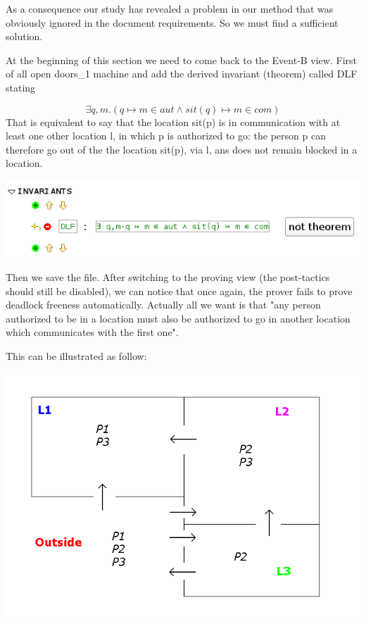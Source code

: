 As a consequence our study has revealed a problem in our method that was obviously ignored in the document requirements.
So we must find a sufficient solution.

At the beginning of this section we need to come back to the \textsf{Event-B view}.
First of all open doors\_1 machine and add the derived invariant (theorem) called DLF stating 

\[
\exists q,m.(q \mapsto m \in aut \land sit(q) \mapsto m \in com )
\]
That is equivalent to say that the location sit(p) is in communication with at least one other location l, in which p is authorized to go:
the person p can therefore go out of the the location sit(p), via l, ans does not remain blocked in a location.

\begin{center}
	\includegraphics[]{img/tutorial/tut_10_invariants2.png}
\end{center}

Then we save the file. After switching to the proving view (the post-tactics should still be disabled), we can notice that once again, the prover fails to prove deadlock freeness automatically. 
Actually all we want is that "any person authorized to be in a location must also be authorized to go in another location which communicates with the first one".

This can be illustrated as follow:
\begin{center}
	\includegraphics[]{img/tutorial/tut_10_graph.png}
\end{center}

